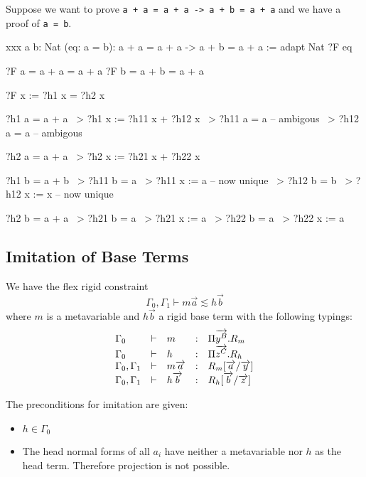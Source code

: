 Suppose we want to prove {\tt a + a = a + a -> a + b = a + a} and we have a
proof of {\tt a = b}.

\begin{alba}
    xxx {a b: Nat} (eq: a = b):  a + a = a + a -> a + b = a + a
    :=
        adapt {Nat} {?F} eq
\end{alba}


\begin{alba}
    ?F a = a + a = a + a
    ?F b = a + b = a + a

    ?F x := ?h1 x = ?h2 x

    ?h1 a = a + a       ~> ?h1 x := ?h11 x + ?h12 x
                        ~> ?h11 a = a       -- ambigous
                        ~> ?h12 a = a       -- ambigous

    ?h2 a = a + a       ~> ?h2 x := ?h21 x + ?h22 x

    ?h1 b = a + b       ~> ?h11 b = a           ~> ?h11 x := a  -- now unique
                        ~> ?h12 b = b           ~> ?h12 x := x  -- now unique

    ?h2 b = a + a       ~> ?h21 b = a           ~> ?h21 x := a
                        ~> ?h22 b = a           ~> ?h22 x := a

\end{alba}








\subsection{Imitation of Base Terms}

We have the flex rigid constraint
$$
    \Gamma_0, \Gamma_1 \vdash m \vec a \lesssim h \vec b
$$
where $m$ is a metavariable and $h \vec b$ a rigid base term with the following
typings:
$$
\begin{array}{lllll} 
    \Gamma_0 &\vdash& m &:& \Pi {\overrightarrow {y^B}}. R_m
    \\
    \Gamma_0 &\vdash& h &:& \Pi {\overrightarrow {z^C}}. R_h
    \\
    \Gamma_0, \Gamma_1 &\vdash& m {\overrightarrow {a}} &:& R_m[{\overrightarrow {a}} / {\overrightarrow {y}}]
    \\
    \Gamma_0, \Gamma_1 &\vdash& h {\overrightarrow {b}} &:& R_h[{\overrightarrow {b}} / {\overrightarrow {z}}]
 \end{array}
$$

The preconditions for imitation are given:
\begin{itemize}

    \item $h \in \Gamma_0$

    \item The head normal forms of all $a_i$ have neither a metavariable nor $h$
        as the head term. Therefore projection is not possible.

\end{itemize}


